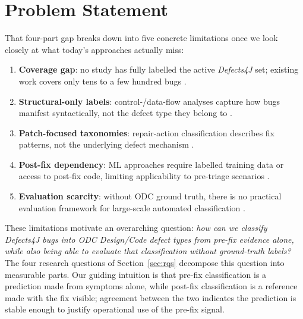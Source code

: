 \section{Problem Statement}
\label{sec:problem}

That four-part gap breaks down into five concrete limitations once we look
closely at what today's approaches actually miss:

\begin{enumerate}
  \item \textbf{Coverage gap}: no study has fully labelled the active
        \textit{Defects4J} set; existing work covers only tens to a few hundred
        bugs \citep{xuan2017better,vanderspuy2025anatomy,sobreira2018dissection}.
  \item \textbf{Structural-only labels}: control-/data-flow analyses capture
        how bugs manifest syntactically, not the defect type they belong to
        \citep{vanderspuy2025anatomy}.
  \item \textbf{Patch-focused taxonomies}: repair-action classification
        describes fix patterns, not the underlying defect mechanism
        \citep{sobreira2018dissection}.
  \item \textbf{Post-fix dependency}: ML approaches require labelled training
        data or access to post-fix code, limiting applicability to pre-triage
        scenarios \citep{thung2012automatic}.
  \item \textbf{Evaluation scarcity}: without ODC ground truth, there is no
        practical evaluation framework for large-scale automated classification
        \citep{andrade2025empirical}.
\end{enumerate}

These limitations motivate an overarching question: \emph{how can we classify
\textit{Defects4J} bugs into ODC Design/Code defect types from pre-fix evidence
alone, while also being able to evaluate that classification without
ground-truth labels?} The four research questions of
Section~\ref{sec:rqs} decompose this question into measurable parts. Our
guiding intuition is that pre-fix classification is a prediction made from
symptoms alone, while post-fix classification is a reference made with the fix
visible; agreement between the two indicates the prediction is stable enough to
justify operational use of the pre-fix signal.

